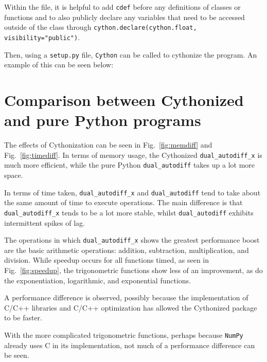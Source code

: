 \documentclass[11pt,a4paper]{article}
\begin{document}
Within the file, it is helpful to add \texttt{cdef} before any definitions of classes or functions and to also publicly declare any variables that need to be accessed outside of the class through \texttt{cython.declare(cython.float, visibility="public")}.

Then, using a \texttt{setup.py} file, \texttt{Cython} can be called to cythonize the program. An example of this can be seen below:



\section{Comparison between Cythonized and pure Python programs}

The effects of Cythonization can be seen in Fig.~\ref{fig:memdiff} and Fig.~\ref{fig:timediff}. In terms of memory usage, the Cythonized \texttt{dual\_autodiff\_x} is much more efficient, while the pure Python \texttt{dual\_autodiff} takes up a lot more space.

In terms of time taken, \texttt{dual\_autodiff\_x} and \texttt{dual\_autodiff} tend to take about the same amount of time to execute operations. The main difference is that \texttt{dual\_autodiff\_x} tends to be a lot more stable, whilst \texttt{dual\_autodiff} exhibits intermittent spikes of lag.

The operations in which \texttt{dual\_autodiff\_x} shows the greatest performance boost are the basic arithmetic operations: addition, subtraction, multiplication, and division. While speedup occurs for all functions timed, as seen in Fig.~\ref{fig:speedup}, the trigonometric functions show less of an improvement, as do the exponentiation, logarithmic, and exponential functions.

A performance difference is observed, possibly because the implementation of C/C++ libraries and C/C++ optimization has allowed the Cythonized package to be faster.

With the more complicated trigonometric functions, perhaps because \texttt{NumPy} already uses C in its implementation, not much of a performance difference can be seen.
\end{document}
